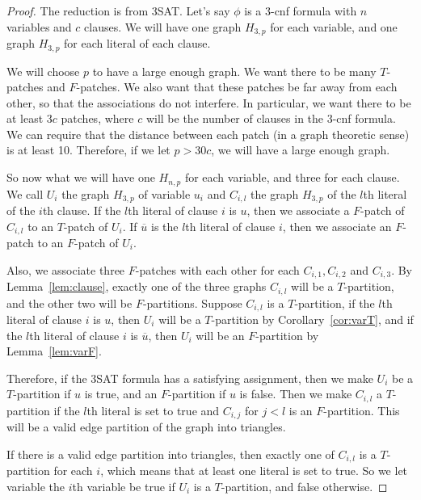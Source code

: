 \documentclass[runningheads,a4paper]{llncs}
\begin{document}
\begin{proof}

The reduction is from 3SAT. Let's say $\phi$ is a 3-cnf formula with $n$ variables and $c$ clauses. We will have one graph $H_{3,p}$ for each variable, and one graph $H_{3,p}$ for each literal of each clause. 

We will choose $p$ to have a large enough graph. We want there to be many $T$-patches and $F$-patches. We also want that these patches be far away from each other, so that the associations do not interfere. In particular, we want there to be at least $3c$ patches, where $c$ will be the number of clauses in the 3-cnf formula. We can require that the distance between each patch (in a graph theoretic sense) is at least 10. Therefore, if we let $p > 30c$, we will have a large enough graph. 

So now what we will have one $H_{n,p}$ for each variable, and three for each clause. We call $U_i$ the graph $H_{3,p}$ of variable $u_i$ and $C_{i,l}$ the graph $H_{3,p}$ of the $l$th literal of the $i$th clause. If the $l$th literal of clause $i$ is $u$, then we associate a $F$-patch of $C_{i,l}$ to an $T$-patch of $U_i$. If $\overline{u}$ is the $l$th literal of clause $i$, then we associate an $F$-patch to an $F$-patch of $U_i$. 

Also, we associate three $F$-patches with each other for each $C_{i, 1}, C_{i,2}$ and $C_{i,3}$. By Lemma~\ref{lem:clause}, exactly one of the three graphs $C_{i,l}$ will be a $T$-partition, and the other two will be $F$-partitions. Suppose $C_{i,l}$ is a $T$-partition, if the $l$th literal of clause $i$ is $u$, then $U_i$ will be a $T$-partition by Corollary~\ref{cor:varT}, and if the $l$th literal of clause $i$ is $\overline{u}$, then $U_i$ will be an $F$-partition by Lemma~\ref{lem:varF}.

Therefore, if the 3SAT formula has a satisfying assignment, then we make $U_i$ be a $T$-partition if $u$ is true, and an $F$-partition if $u$ is false. Then we make $C_{i,l}$ a $T$-partition if the $l$th literal is set to true and $C_{i, j}$ for $j < l$ is an $F$-partition. This will be a valid edge partition of the graph into triangles. 

If there is a valid edge partition into triangles, then exactly one of $C_{i,l}$ is a $T$-partition for each $i$, which means that at least one literal is set to true. So we let variable the $i$th variable be true if $U_i$ is a $T$-partition, and false otherwise. 
\end{proof}
\end{document}
